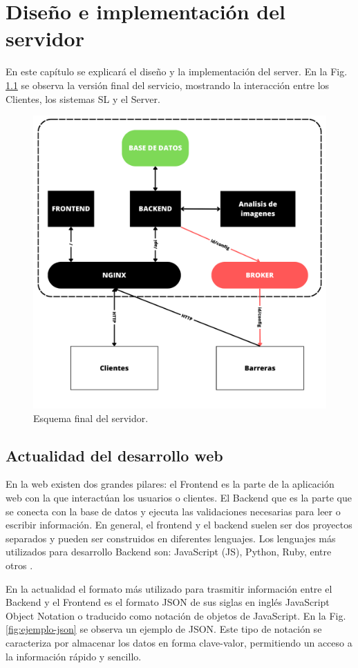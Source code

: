 \chapter{Diseño e implementación del servidor}

En este capítulo se explicará el diseño y la implementación del server. En la Fig. \ref{fig:server-final} se observa la versión final del servicio, mostrando la interacción entre los Clientes, los sistemas SL y el Server.

\begin{figure}[bth]
    \centering
    \includegraphics[width=.6\textwidth]{imgs/server-esquema.png}
    \caption{Esquema final del servidor.}
    \label{fig:server-final}
\end{figure}

\section{Actualidad del desarrollo web}

En la web existen dos grandes pilares: el Frontend es la parte de la aplicación web con la que interactúan los usuarios o clientes. El Backend que es la parte que se conecta con la base de datos y ejecuta las validaciones necesarias para leer o escribir información. En general, el frontend y el backend suelen ser dos proyectos separados y pueden ser construidos en diferentes lenguajes. Los lenguajes más utilizados para desarrollo Backend son: JavaScript (JS), Python, Ruby, entre otros \cite{presta_10_2021}.

En la actualidad el formato más utilizado para trasmitir información entre el Backend y el Frontend es el formato JSON de sus siglas en inglés JavaScript Object Notation o traducido como notación de objetos de JavaScript. En la Fig. \ref{fig:ejemplo-json} se observa un ejemplo de JSON. Este tipo de notación se caracteriza por almacenar los datos en forma clave-valor, permitiendo un acceso a la información rápido y sencillo.

